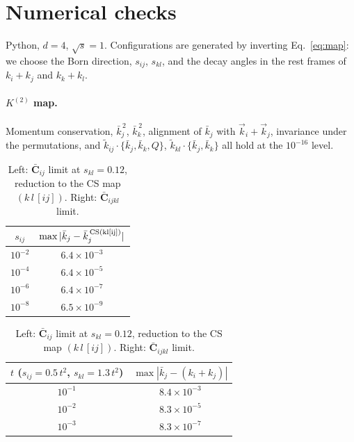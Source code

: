 \documentclass[11pt,a4paper]{article}
\newcommand{\bbC}[1]{\bar{\mathbf C}_{#1}}
\newcommand{\jb}{\bar k_{j}}
\newcommand{\kb}{\bar k_{k}}
\begin{document}
\section{Numerical checks}
\label{sec:checks}
Python, $d=4$, $\sqrt s=1$. Configurations are generated by inverting Eq.~\eqref{eq:map}: we choose
the Born direction, $s_{ij}$, $s_{kl}$, and the decay angles in the rest frames of $k_i+k_j$ and $k_k+k_l$.

\paragraph{$K^{(2)}$ map.} Momentum conservation, $\jb^{\,2}$, $\kb^{\,2}$, alignment of $\jb$ with
$\vec k_i+\vec k_j$, invariance under the permutations, and
$\tilde k_{ij}\cdot\{\jb,\kb,Q\}$, $\tilde k_{kl}\cdot\{\jb,\kb\}$ all hold at the $10^{-16}$ level.

\begin{table}[h]\centering
\begin{tabular}{cc}\toprule
$s_{ij}$ & $\max|\jb-\jb^{\,\rm CS(kl[ij])}|$\\\midrule
$10^{-2}$ & $6.4\times10^{-3}$\\
$10^{-4}$ & $6.4\times10^{-5}$\\
$10^{-6}$ & $6.4\times10^{-7}$\\
$10^{-8}$ & $6.5\times10^{-9}$\\\bottomrule
\end{tabular}
\qquad
\begin{tabular}{cc}\toprule
$t$ ($s_{ij}=0.5\,t^2$, $s_{kl}=1.3\,t^2$) & $\max|\jb-(k_i+k_j)|$\\\midrule
$10^{-1}$ & $8.4\times10^{-3}$\\
$10^{-2}$ & $8.3\times10^{-5}$\\
$10^{-3}$ & $8.3\times10^{-7}$\\\bottomrule
\end{tabular}
\caption{Left: $\bbC{ij}$ limit at $s_{kl}=0.12$, reduction to the CS map $(k\,l\,[ij])$.
Right: $\bbC{ijkl}$ limit.}
\end{table}
\end{document}
